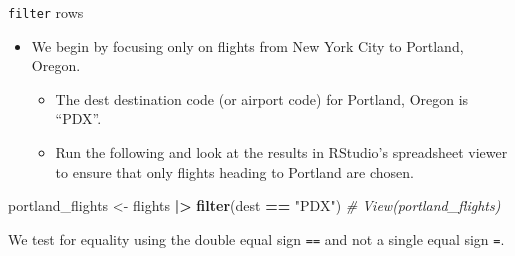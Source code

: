 \documentclass[
  ignorenonframetext,
]{beamer}
\newenvironment{Shaded}{\begin{snugshade}}{\end{snugshade}}
\newcommand{\CommentTok}[1]{\textcolor[rgb]{0.56,0.35,0.01}{\textit{#1}}}
\newcommand{\FunctionTok}[1]{\textcolor[rgb]{0.13,0.29,0.53}{\textbf{#1}}}
\newcommand{\NormalTok}[1]{#1}
\newcommand{\OtherTok}[1]{\textcolor[rgb]{0.56,0.35,0.01}{#1}}
\newcommand{\SpecialCharTok}[1]{\textcolor[rgb]{0.81,0.36,0.00}{\textbf{#1}}}
\newcommand{\StringTok}[1]{\textcolor[rgb]{0.31,0.60,0.02}{#1}}
\providecommand{\tightlist}{%
  \setlength{\itemsep}{0pt}\setlength{\parskip}{0pt}}
\begin{document}
\begin{frame}[fragile]{\texttt{filter} rows}
\label{filter-rows-1}
\begin{itemize}
\item
  We begin by focusing only on flights from New York City to Portland,
  Oregon.

  \begin{itemize}
  \tightlist
  \item
    The dest destination code (or airport code) for Portland, Oregon is
    ``PDX''.
  \item
    Run the following and look at the results in RStudio's spreadsheet
    viewer to ensure that only flights heading to Portland are chosen.
  \end{itemize}
\end{itemize}

\normalsize

\begin{Shaded}
\begin{Highlighting}[]
\NormalTok{portland\_flights }\OtherTok{\textless{}{-}}\NormalTok{ flights }\SpecialCharTok{|\textgreater{}} 
  \FunctionTok{filter}\NormalTok{(dest }\SpecialCharTok{==} \StringTok{"PDX"}\NormalTok{)}
\CommentTok{\# View(portland\_flights)}
\end{Highlighting}
\end{Shaded}

\normalsize

We test for equality using the double equal sign \texttt{==} and not a
single equal sign \texttt{=}.
\end{frame}
\end{document}
